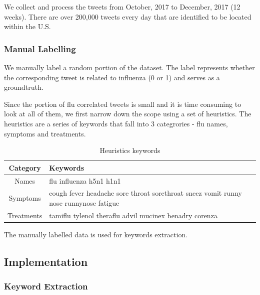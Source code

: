 \documentclass[12pt, oneside]{article}
\begin{document}
We collect and process the tweets from October, 2017 to December, 2017 (12 weeks).
There are over 200,000 tweets every day that are identified to be located within the U.S.

\subsubsection{Manual Labelling}

We manually label a random portion of the dataset. The label represents whether the corresponding tweet is related to influenza (0 or 1) and serves as a groundtruth.

Since the portion of flu correlated tweets is small and it is time consuming to look at all of them, we first narrow down the scope using a set of heuristics.
The heuristics are a series of keywords that fall into 3 categrories - flu names, symptoms and treatments.

\begin{table}[h]
  \centering
  \caption{Heuristics keywords}
  \label{table:heuristics}
  \begin{tabularx}{.7\textwidth}{ |c|X| }
    \hline
    \textbf{Category} & \textbf{Keywords} \\
    \hline
    \hline
    Names & flu influenza h5n1 h1n1 \\
    \hline
    Symptoms & cough fever headache sore throat \newline sorethroat sneez vomit runny nose \newline runnynose fatigue \\
    \hline
    Treatments & tamiflu tylenol theraflu advil mucinex \newline benadry corenza \\
    \hline
  \end{tabularx}
\end{table}

The manually labelled data is used for keywords extraction.

\subsection{Implementation}


\subsubsection{Keyword Extraction}
\end{document}
